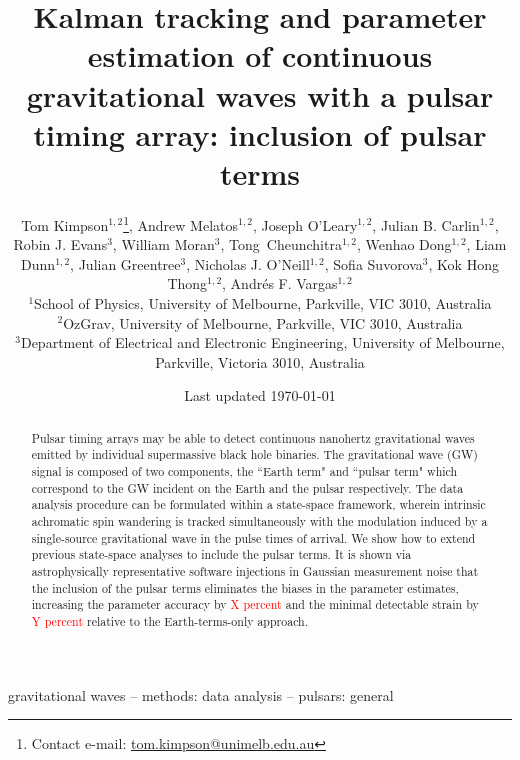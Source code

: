 \documentclass[fleqn,usenatbib,useAMS]{mnras}
\title[Kalman PTA]{Kalman tracking and parameter estimation of continuous gravitational waves with a pulsar timing array: inclusion of pulsar terms}
\author[Kimpson]{Tom Kimpson$^{1,2}$\thanks{Contact e-mail: \href{tom.kimpson@unimelb.edu.au}{tom.kimpson@unimelb.edu.au}}, Andrew Melatos$^{1,2}$, Joseph O'Leary$^{1,2}$, Julian B. Carlin$^{1,2}$, Robin J. Evans$^{3}$, \newauthor William Moran$^{3}$, Tong Cheunchitra$^{1,2}$, Wenhao Dong$^{1,2}$, Liam Dunn$^{1,2}$, Julian Greentree$^{3}$, Nicholas J. O'Neill$^{1,2}$, \newauthor Sofia Suvorova$^{3}$, Kok Hong Thong$^{1,2}$, Andrés F. Vargas$^{1,2}$%
\\
$^{1}$School of Physics, University of Melbourne, Parkville, VIC 3010, Australia \\
$^{2}$OzGrav, University of Melbourne, Parkville, VIC 3010, Australia \\
$^{3}$Department of Electrical and Electronic Engineering, University of Melbourne, Parkville, Victoria 3010, Australia }
\date{Last updated \today}
\begin{document}
\label{firstpage}
\pagerange{\pageref{firstpage}--\pageref{lastpage}}
\maketitle

\begin{abstract}	
	 Pulsar timing arrays may be able to detect continuous nanohertz gravitational waves emitted by individual supermassive black hole binaries. The gravitational wave (GW) signal is composed of two components, the ``Earth term" and ``pulsar term" which correspond to the GW incident on the Earth and the pulsar respectively. The data analysis procedure can be formulated within a state-space framework, wherein intrinsic achromatic spin wandering is tracked simultaneously with the modulation induced by a single-source gravitational wave in the pulse times of arrival. We show how to extend previous state-space analyses to include the pulsar terms. It is shown via astrophysically representative software injections in Gaussian measurement noise that the inclusion of the pulsar terms eliminates the biases in the parameter estimates, increasing the parameter accuracy by \textcolor{red}{X percent} and the minimal detectable strain by \textcolor{red}{Y percent} relative to the Earth-terms-only approach.
\end{abstract}

\begin{keywords}
gravitational waves -- methods: data analysis -- pulsars: general
\end{keywords}



\begingroup
\let\clearpage\relax
\endgroup
\newpage
\end{document}
